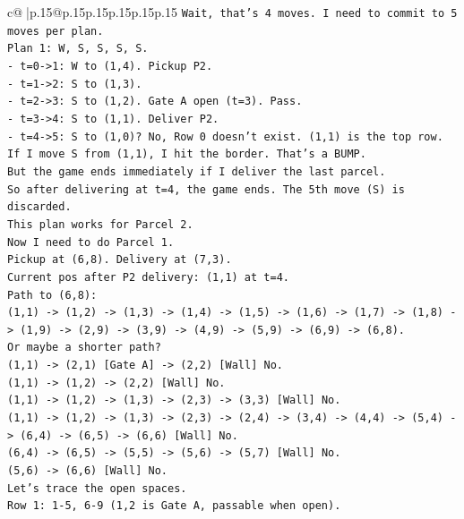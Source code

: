 \documentclass{article}
\begin{document}
{\begin{supertabular}{c@{$\;$}|p{.15\linewidth}@{}p{.15\linewidth}p{.15\linewidth}p{.15\linewidth}p{.15\linewidth}p{.15\linewidth}}
{{{\texttt{Wait, that's 4 moves. I need to commit to 5 moves per plan.} \\
\texttt{Plan 1: W, S, S, S, S.} \\
\texttt{{-} t=0{-}>1: W to (1,4). Pickup P2.} \\
\texttt{{-} t=1{-}>2: S to (1,3).} \\
\texttt{{-} t=2{-}>3: S to (1,2). Gate A open (t=3). Pass.} \\
\texttt{{-} t=3{-}>4: S to (1,1). Deliver P2.} \\
\texttt{{-} t=4{-}>5: S to (1,0)? No, Row 0 doesn't exist. (1,1) is the top row.} \\
\texttt{If I move S from (1,1), I hit the border. That's a BUMP.} \\
\texttt{But the game ends immediately if I deliver the last parcel.} \\
\texttt{So after delivering at t=4, the game ends. The 5th move (S) is discarded.} \\
\texttt{This plan works for Parcel 2.} \\
\texttt{Now I need to do Parcel 1.} \\
\texttt{Pickup at (6,8). Delivery at (7,3).} \\
\texttt{Current pos after P2 delivery: (1,1) at t=4.} \\
\texttt{Path to (6,8):} \\
\texttt{(1,1) {-}> (1,2) {-}> (1,3) {-}> (1,4) {-}> (1,5) {-}> (1,6) {-}> (1,7) {-}> (1,8) {-}> (1,9) {-}> (2,9) {-}> (3,9) {-}> (4,9) {-}> (5,9) {-}> (6,9) {-}> (6,8).} \\
\texttt{Or maybe a shorter path?} \\
\texttt{(1,1) {-}> (2,1) {[}Gate A{]} {-}> (2,2) {[}Wall{]} No.} \\
\texttt{(1,1) {-}> (1,2) {-}> (2,2) {[}Wall{]} No.} \\
\texttt{(1,1) {-}> (1,2) {-}> (1,3) {-}> (2,3) {-}> (3,3) {[}Wall{]} No.} \\
\texttt{(1,1) {-}> (1,2) {-}> (1,3) {-}> (2,3) {-}> (2,4) {-}> (3,4) {-}> (4,4) {-}> (5,4) {-}> (6,4) {-}> (6,5) {-}> (6,6) {[}Wall{]} No.} \\
\texttt{(6,4) {-}> (6,5) {-}> (5,5) {-}> (5,6) {-}> (5,7) {[}Wall{]} No.} \\
\texttt{(5,6) {-}> (6,6) {[}Wall{]} No.} \\
\texttt{Let's trace the open spaces.} \\
\texttt{Row 1: 1{-}5, 6{-}9 (1,2 is Gate A, passable when open).} \\
}}}
\end{supertabular}}
\end{document}
